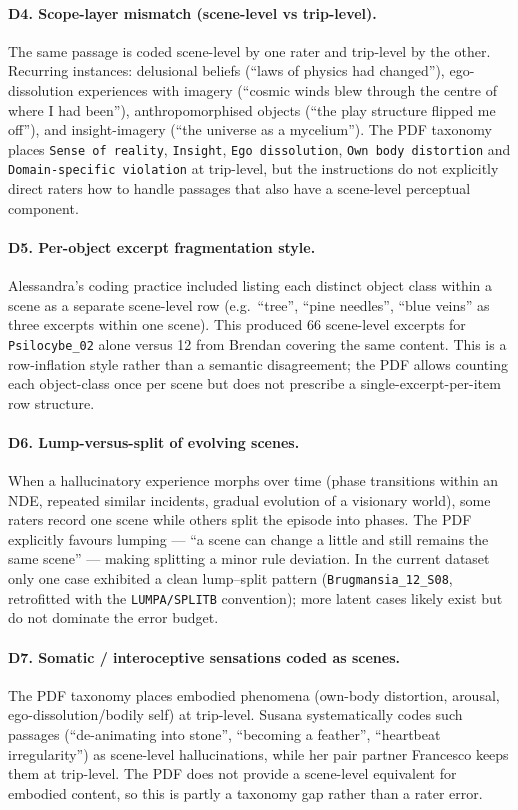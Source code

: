 \paragraph{D4. Scope-layer mismatch (scene-level vs trip-level).}
The same passage is coded scene-level by one rater and trip-level by the other. Recurring instances: delusional beliefs (``laws of physics had changed''), ego-dissolution experiences with imagery (``cosmic winds blew through the centre of where I had been''), anthropomorphised objects (``the play structure flipped me off''), and insight-imagery (``the universe as a mycelium''). The PDF taxonomy places \texttt{Sense of reality}, \texttt{Insight}, \texttt{Ego dissolution}, \texttt{Own body distortion} and \texttt{Domain-specific violation} at trip-level, but the instructions do not explicitly direct raters how to handle passages that also have a scene-level perceptual component.

\paragraph{D5. Per-object excerpt fragmentation style.}
Alessandra's coding practice included listing each distinct object class within a scene as a separate scene-level row (e.g.\ ``tree'', ``pine needles'', ``blue veins'' as three excerpts within one scene). This produced 66 scene-level excerpts for \texttt{Psilocybe\_02} alone versus 12 from Brendan covering the same content. This is a row-inflation style rather than a semantic disagreement; the PDF allows counting each object-class once per scene but does not prescribe a single-excerpt-per-item row structure.

\paragraph{D6. Lump-versus-split of evolving scenes.}
When a hallucinatory experience morphs over time (phase transitions within an NDE, repeated similar incidents, gradual evolution of a visionary world), some raters record one scene while others split the episode into phases. The PDF explicitly favours lumping --- ``a scene can change a little and still remains the same scene'' --- making splitting a minor rule deviation. In the current dataset only one case exhibited a clean lump--split pattern (\texttt{Brugmansia\_12\_S08}, retrofitted with the \texttt{LUMPA/SPLITB} convention); more latent cases likely exist but do not dominate the error budget.

\paragraph{D7. Somatic / interoceptive sensations coded as scenes.}
The PDF taxonomy places embodied phenomena (own-body distortion, arousal, ego-dissolution/bodily self) at trip-level. Susana systematically codes such passages (``de-animating into stone'', ``becoming a feather'', ``heartbeat irregularity'') as scene-level hallucinations, while her pair partner Francesco keeps them at trip-level. The PDF does not provide a scene-level equivalent for embodied content, so this is partly a taxonomy gap rather than a rater error.

